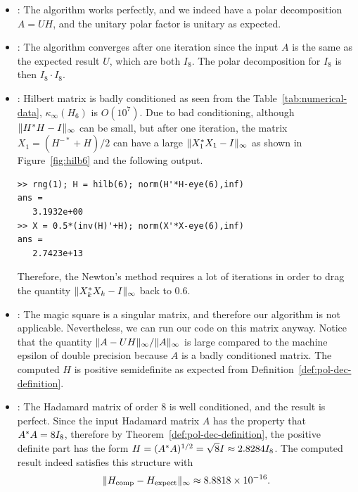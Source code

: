 \documentclass[12pt]{article}
\begin{document}
\begin{itemize}
    \item {}: The algorithm works perfectly, and we indeed have a polar decomposition $A = UH$, and the unitary polar factor is unitary as expected. 
    \item {}: The algorithm converges after one iteration since the input $A$ is the same as the expected result $U$, which are both $I_8$. The polar decomposition for $I_8$ is then $I_8 \cdot I_8$.
    \item {}: Hilbert matrix is badly conditioned as seen from the Table~\ref{tab:numerical-data}, $\kappa_\infty(H_6)$ is $O(10^7)$. Due to bad conditioning, although $\|{H^* H - I}\|_\infty$ can be small, but after one iteration, the matrix $X_{1} = (H^{-*} + H)/2$ can have a large $\|{X_1^* X_1 - I}\|_\infty$ as shown in Figure~\ref{fig:hilb6} and the following output.
\begin{lstlisting}
>> rng(1); H = hilb(6); norm(H'*H-eye(6),inf)
ans =
   3.1932e+00
>> X = 0.5*(inv(H)'+H); norm(X'*X-eye(6),inf)
ans =
   2.7423e+13
\end{lstlisting}
Therefore, the Newton's method requires a lot of iterations in order to drag the quantity $\|{X_k^* X_k - I}\|_\infty$ back to $0.6$.
    \item {}: The magic square is a singular matrix, and therefore our algorithm is not applicable. Nevertheless, we can run our code on this matrix anyway. Notice that the quantity $\|{A-UH}\|_\infty/\|{A}\|_\infty$ is large compared to the machine epsilon of double precision because $A$ is a badly conditioned matrix. The computed $H$ is positive semidefinite as expected from Definition~\ref{def:pol-dec-definition}. 
    \item {}: The Hadamard matrix of order 8 is well conditioned, and the result is perfect. Since the input Hadamard matrix $A$ has the property that $A^* A = 8I_8$, therefore by Theorem~\ref{def:pol-dec-definition}, the positive definite part has the form $H = (A^* A)^{1/2} = \sqrt{8}I \approx 2.8284I_8$. The computed result indeed satisfies this structure with $$\|{H_\mathrm{comp} - H_\mathrm{expect}}\|_\infty\approx 8.8818\times 10^{-16}.$$ 
\end{itemize}
\end{document}
